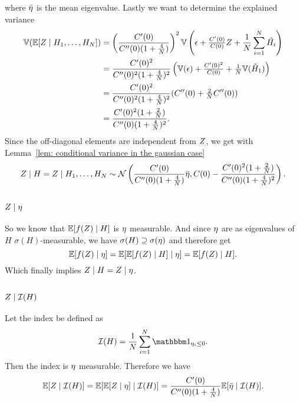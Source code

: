 where \(\bar{\eta}\) is the mean eigenvalue. Lastly we want to determine
the explained variance
\begin{align*}
	\mathbb{V}(\mathbb{E}[Z\mid H_1,\dots,H_N])
	&= \left(\frac{C'(0)}{C''(0)(1+\tfrac4{N})}\right)^2
	\mathbb{V}\left(
		\epsilon + \tfrac{C'(0)}{C(0)}Z + \frac{1}{N}\sum_{i=1}^N \tilde{H_i}
	\right)\\
	&= \frac{C'(0)^2}{C''(0)^2(1+\tfrac4{N})^2}
	\left(
		\mathbb{V}(\epsilon) + \tfrac{C'(0)^2}{C(0)} + \tfrac1{N}\mathbb{V}(\tilde{H}_1)
	\right)\\
	&= \frac{C'(0)^2}{C''(0)^2(1+\tfrac4{N})^2}
	(C''(0) + \tfrac2{N}C''(0))\\
	&= \frac{C'(0)^2(1+\tfrac2{N})}{C''(0)(1+\tfrac4{N})^2}.
\end{align*}
Since the off-diagonal elements are independent from \(Z\), we get with
Lemma~\ref{lem: conditional variance in the gaussian case}
\[
	Z\mid H = Z \mid H_1,\dots, H_N \sim \mathcal{N}\left(
		\frac{C'(0)}{C''(0)(1+\tfrac4{N})}\bar{\eta},
		C(0)-\frac{C'(0)^2(1+\tfrac2{N})}{C''(0)(1+\tfrac4{N})^2}
	\right).
\]

\subsection{\texorpdfstring{\(Z\mid \eta\)}{Z|Λ}}

So we know that \(\mathbb{E}[f(Z)\mid H]\) is \(\eta\)
measurable. And since \(\eta\) are as eigenvalues
of \(H\) \(\sigma(H)\)-measurable, we have \(\sigma(H)\supseteq \sigma(\eta)\)
and therefore get
\[
	\mathbb{E}[f(Z)\mid \eta]
	= \mathbb{E}[\mathbb{E}[f(Z)\mid H] \mid \eta]
	= \mathbb{E}[f(Z)\mid H].
\]
Which finally implies \(Z\mid H = Z\mid \eta\).

\subsection{\texorpdfstring{\(Z\mid\mathcal{I}(H)\)}{Z|I(H)}}

Let the index be defined as
\[
	\negEV(H)=\frac1{\dims}\sum_{i=1}^\dims \ind_{\evH_i \le 0}.
\]
Then the index is \(\eta\) measurable. Therefore we have
\[
	\mathbb{E}[Z\mid \mathcal{I}(H)]
	= \mathbb{E}[\mathbb{E}[Z\mid \eta]\mid \mathcal{I}(H)]
	= \frac{C'(0)}{C''(0)(1+\tfrac4{N})}
	\mathbb{E}[\bar{\eta}\mid \mathcal{I}(H)].
\]

